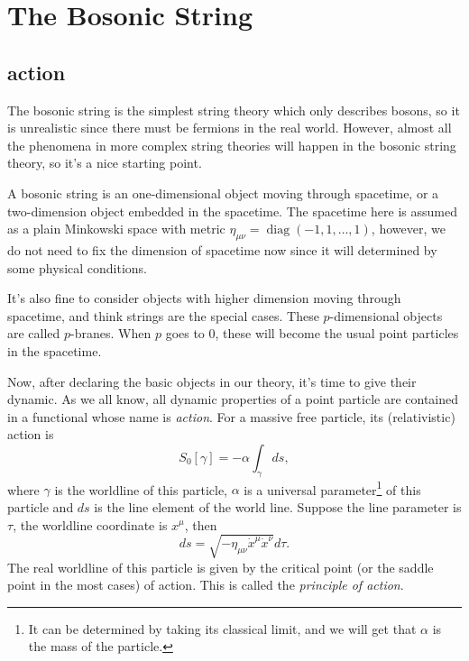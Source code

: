 \chapter{The Bosonic String}

\section{action}

The bosonic string is the simplest string theory which only
describes bosons, so it is unrealistic since 
there must be fermions in the real world. However, almost
all the phenomena in more complex string theories will happen
in the bosonic string theory, so it's a nice starting point.

A bosonic string is an one-dimensional object moving through
spacetime, or a two-dimension object embedded in 
the spacetime. The spacetime here is assumed as a plain
Minkowski space with metric $\eta_{\mu\nu}=\operatorname{diag}
(-1,1,\dots,1)$, however, we do not need to fix the dimension of 
spacetime now since it will determined by some physical conditions.

It's also fine to consider objects with higher dimension moving 
through spacetime, and think strings are the special cases. These 
$p$-dimensional objects are called $p$-branes. When $p$ goes to 
$0$, these will become the usual point particles in the spacetime.

Now, after declaring the basic objects in our theory, it's time to
give their dynamic. As we all know, all dynamic properties of 
a point particle are contained in a functional whose name is 
\textit{action}. For a massive free particle, its (relativistic) 
action is
\begin{equation}\label{free_particle_action}
	S_0[\gamma]=-\alpha \int_\gamma ds,
\end{equation}
where $\gamma$ is the worldline of this particle, $\alpha$ is
a universal parameter\footnote{
	It can be determined by taking its classical limit, and
	we will get that $\alpha$ is the mass of the particle.}
of this particle and $ds$
is the line element of the world line. Suppose 
the line parameter is $\tau$, the worldline coordinate
is $x^\mu$, then
\[
	ds=\sqrt{-\eta_{\mu\nu}\dot x^\mu \dot x^\nu}d\tau.
\]
The real
worldline of this particle is given by the critical point
(or the saddle point in the most cases) of action. This 
is called the \textit{principle of action}.

